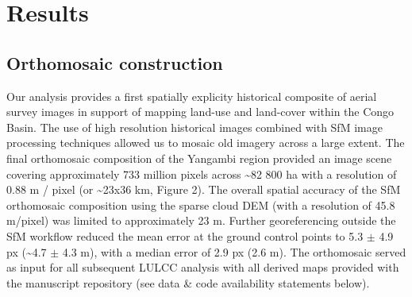 \documentclass[remote sensing,article,submit,moreauthors,pdftex]{mdpi}
\begin{document}
\hypertarget{results}{%
\section{Results}\label{results}}

\hypertarget{orthomosaic-construction}{%
\subsection{Orthomosaic construction}\label{orthomosaic-construction}}

Our analysis provides a first spatially explicity historical composite
of aerial survey images in support of mapping land-use and land-cover
within the Congo Basin. The use of high resolution historical images
combined with SfM image processing techniques allowed us to mosaic old
imagery across a large extent. The final orthomosaic composition of the
Yangambi region provided an image scene covering approximately 733
million pixels across \textasciitilde{}82 800 ha with a resolution of
0.88 m / pixel (or \textasciitilde{}23x36 km, Figure 2). The overall
spatial accuracy of the SfM orthomosaic composition using the sparse
cloud DEM (with a resolution of 45.8 m/pixel) was limited to
approximately 23 m. Further georeferencing outside the SfM workflow
reduced the mean error at the ground control points to 5.3 \(\pm\) 4.9
px (\textasciitilde{}4.7 \(\pm\) 4.3 m), with a median error of 2.9 px
(2.6 m). The orthomosaic served as input for all subsequent LULCC
analysis with all derived maps provided with the manuscript repository
(see data \& code availability statements below).
\end{document}

